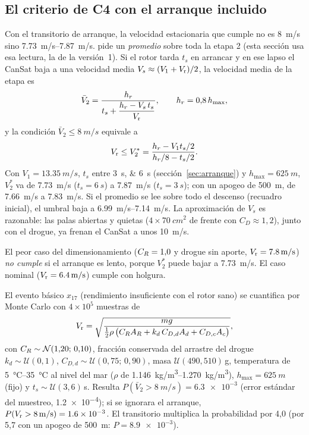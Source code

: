 \subsection{El criterio de C4 con el arranque incluido}\label{sec:confiabilidad-x17}
Con el transitorio de arranque, la velocidad estacionaria que cumple  no es
\SI{8}{m/s} sino \SIrange{7.73}{7.87}{m/s}.  pide un \emph{promedio} sobre toda
la etapa 2 (esta sección usa esa lectura, la de la versión~1). Si el rotor tarda $t_s$ en arrancar y en ese lapso el CanSat baja a una
velocidad media $V_s\approx(V_1+V_{\mathrm{r}})/2$, la velocidad media de la etapa es
\begin{equation}
  \bar V_2=\frac{h_r}{t_s+\dfrac{h_r-V_s\,t_s}{V_{\mathrm{r}}}},\qquad h_r=0{,}8\,h_{\max},
  \label{eq:confiabilidad-vmedia}
\end{equation}
y la condición $\bar V_2\le\SI{8}{m/s}$ equivale a
\begin{equation}
  V_{\mathrm{r}}\le V_2^{*}=\frac{h_r-V_1t_s/2}{h_r/8-t_s/2}.
  \label{eq:confiabilidad-umbral}
\end{equation}
Con $V_1=\SI{13.35}{m/s}$, $t_s$ entre \SIlist{3;6}{s} (sección~\ref{sec:arranque}) y
$h_{\max}=\SI{625}{m}$, $V_2^{*}$ va de \SI{7.73}{m/s} ($t_s=\SI{6}{s}$) a \SI{7.87}{m/s}
($t_s=\SI{3}{s}$); con un apogeo de \SI{500}{m}, de \SI{7.66}{m/s} a \SI{7.83}{m/s}. Si el
promedio se lee sobre todo el descenso (recuadro inicial), el umbral baja a
\SIrange{6.99}{7.14}{m/s}. La aproximación de $V_s$ es
razonable: las palas abiertas y quietas ($4\times\SI{70}{cm^2}$ de frente con
$C_D\approx1{,}2$), junto con el drogue, ya frenan el CanSat a unos \SI{10}{m/s}.

\begin{nota}
El peor caso del dimensionamiento ($C_{R}=1{,}0$ y drogue sin aporte,
$V_{\mathrm{r}}=\SI{7.8}{m/s}$) \emph{no cumple}  si el arranque es lento,
porque $V_2^{*}$ puede bajar a \SI{7.73}{m/s}. El caso nominal
($V_{\mathrm{r}}=\SI{6.4}{m/s}$) cumple con holgura.
\end{nota}

El evento básico $x_{17}$ (rendimiento insuficiente con el rotor sano) se cuantifica por
Monte Carlo con $4\times10^5$ muestras de
\begin{equation}
  V_{\mathrm{r}}=\sqrt{\frac{m g}{\tfrac12\rho\,\bigl(C_{R} A_R+k_d\,C_{D,d}A_d+C_{D,c}A_c\bigr)}},
  \label{eq:confiabilidad-v2}
\end{equation}
con $C_{R}\sim\mathcal N(1{,}20;\,0{,}10)$, fracción conservada del arrastre del drogue
$k_d\sim\mathcal U(0,1)$, $C_{D,d}\sim\mathcal U(0{,}75;\,0{,}90)$, masa
$\mathcal U(490,510)$\,g, temperatura de \SIrange{5}{35}{\celsius} al nivel del mar
($\rho$ de \SIrange{1.146}{1.270}{kg/m^3}), $h_{\max}=\SI{625}{m}$ (fijo) y
$t_s\sim\mathcal U(3,6)$\,s. Resulta $P(\bar V_2>\SI{8}{m/s})=\num{6.3e-3}$ (error
estándar del muestreo, \num{1.2e-4}); si se
ignorara el arranque, $P(V_{\mathrm{r}}>\SI{8}{m/s})=\num{1.6e-3}$. El transitorio multiplica la
probabilidad por 4,0 (por 5,7 con un apogeo de \SI{500}{m}: $P=\num{8.9e-3}$).

